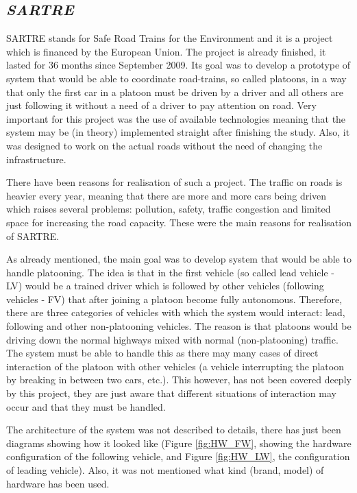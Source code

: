 \subsection{\textit{SARTRE}}\label{sec:SARTRE}

SARTRE \cite{Chan2012ProjectSARTRE} stands for Safe Road Trains for the Environment and it is a project which is financed by the European Union. The project is already finished, it lasted for 36 months since September 2009. Its goal was to develop a prototype of system that would be able to coordinate road-trains, so called platoons, in a way that only the first car in a platoon must be driven by a driver and all others are just following it without a need of a driver to pay attention on road. Very important for this project was the use of available technologies meaning that the system may be (in theory) implemented straight after finishing the study. Also, it was designed to work on the actual roads without the need of changing the infrastructure.\par
% 
There have been reasons for realisation of such a project. The traffic on roads is heavier every year, meaning that there are more and more cars being driven which raises several problems: pollution, safety, traffic congestion and limited space for increasing the road capacity. These were the main reasons for realisation of SARTRE. \par
% 
As already mentioned, the main goal was to develop system that would be able to handle platooning. The idea is that in the first vehicle (so called lead vehicle - LV) would be a trained driver which is followed by other vehicles (following vehicles - FV) that after joining a platoon become fully autonomous. Therefore, there are three categories of vehicles with which the system would interact: lead, following and other non-platooning vehicles. The reason is that platoons would be driving down the normal highways mixed with normal (non-platooning) traffic. The system must be able to handle this as there may many cases of direct interaction of the platoon with other vehicles (a vehicle interrupting the platoon by breaking in between two cars, etc.). This however, has not been covered deeply by this project, they are just aware that different situations of interaction may occur and that they must be handled.\par
% 
The architecture of the system was not described to details, there has just been diagrams showing how it looked like (Figure \ref{fig:HW_FW}, showing the hardware configuration of the following vehicle, and Figure \ref{fig:HW_LW}, the configuration of leading vehicle). Also, it was not mentioned what kind (brand, model) of hardware has been used.\par
